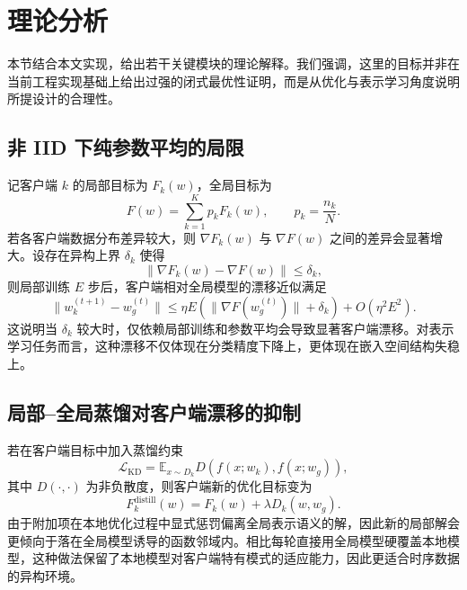 \documentclass{article}
\begin{document}
\section{理论分析}

本节结合本文实现，给出若干关键模块的理论解释。我们强调，这里的目标并非在当前工程实现基础上给出过强的闭式最优性证明，而是从优化与表示学习角度说明所提设计的合理性。

\subsection{非 IID 下纯参数平均的局限}

记客户端 $k$ 的局部目标为 $F_k(w)$，全局目标为
\begin{equation}
F(w)=\sum_{k=1}^{K}p_k F_k(w),\qquad p_k=\frac{n_k}{N}.
\end{equation}
若各客户端数据分布差异较大，则 $\nabla F_k(w)$ 与 $\nabla F(w)$ 之间的差异会显著增大。设存在异构上界 $\delta_k$ 使得
\begin{equation}
\|\nabla F_k(w)-\nabla F(w)\|\leq \delta_k,
\end{equation}
则局部训练 $E$ 步后，客户端相对全局模型的漂移近似满足
\begin{equation}
\|w_k^{(t+1)}-w_g^{(t)}\|
\leq \eta E\left(\|\nabla F(w_g^{(t)})\|+\delta_k\right)
 + O(\eta^2E^2).
\end{equation}
这说明当 $\delta_k$ 较大时，仅依赖局部训练和参数平均会导致显著客户端漂移\cite{fedprox,moon}。对表示学习任务而言，这种漂移不仅体现在分类精度下降上，更体现在嵌入空间结构失稳上\cite{fedu2,fedca}。

\subsection{局部--全局蒸馏对客户端漂移的抑制}

若在客户端目标中加入蒸馏约束
\begin{equation}
\mathcal{L}_{\text{KD}} = \mathbb{E}_{x\sim D_k} D\!\left(f(x;w_k), f(x;w_g)\right),
\end{equation}
其中 $D(\cdot,\cdot)$ 为非负散度，则客户端新的优化目标变为
\begin{equation}
F_k^{\text{distill}}(w)=F_k(w)+\lambda D_k(w,w_g).
\end{equation}
由于附加项在本地优化过程中显式惩罚偏离全局表示语义的解，因此新的局部解会更倾向于落在全局模型诱导的函数邻域内\cite{moon,fedx}。相比每轮直接用全局模型硬覆盖本地模型，这种做法保留了本地模型对客户端特有模式的适应能力，因此更适合时序数据的异构环境\cite{fedu2,flesd}。
\end{document}
